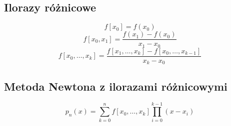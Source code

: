 \documentclass[../mn-notatki.tex]{subfiles}
\begin{document}
\subsection{Ilorazy różnicowe}

\begin{tcolorbox}
\[
f[x_0] = f(x_0)
\]
\[
f[x_0,x_1] = \frac{f(x_1) - f(x_0)}{x_1 - x_0}
\]
\[
f[x_0,\ldots, x_k] = \frac{f[x_1, \ldots, x_k] - f[x_0, \ldots, x_{k-1}]}{x_k - x_0}
\]
\end{tcolorbox}

\subsection{Metoda Newtona z ilorazami różnicowymi}

\begin{tcolorbox}
\[
p_n(x) = \sum_{k=0}^{n} f[x_0,\ldots,x_k] \prod_{i=0}^{k-1} (x-x_i)
\]
\end{tcolorbox}
\end{document}
